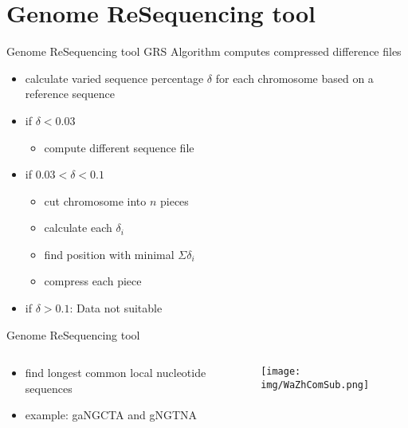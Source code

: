 \documentclass[aspectratio=1610]{beamer}
\begin{document}
\section{Genome ReSequencing tool}
\begin{frame}{Genome ReSequencing tool}
  GRS Algorithm computes compressed difference files 
  \begin{itemize}
    \item calculate varied sequence percentage $\delta$ for each chromosome based on a reference sequence
    \item if $\delta<0.03$
      \begin{itemize}
        \item compute different sequence file
      \end{itemize}
    \item if $0.03<\delta<0.1$
      \begin{itemize}
        \item cut chromosome into $n$ pieces
        \item calculate each $\delta_i$
        \item find position with minimal $\Sigma \delta_i$
        \item compress each piece
      \end{itemize}
    \item if $\delta>0.1$: Data not suitable
  \end{itemize}
\end{frame}

\begin{frame}{Genome ReSequencing tool}
  \begin{columns}
  \begin{column}{6cm}
    \begin{itemize}
      \item find longest common local nucleotide sequences%
      \item example: gaNGCTA and gNGTNA
    \end{itemize}
  \end{column}
  \begin{column}{6cm}
    \begin{figure}
      \texttt{[image: img/WaZhComSub.png]}
    \end{figure}
  \end{column}
  \end{columns}
\end{frame}
\end{document}
